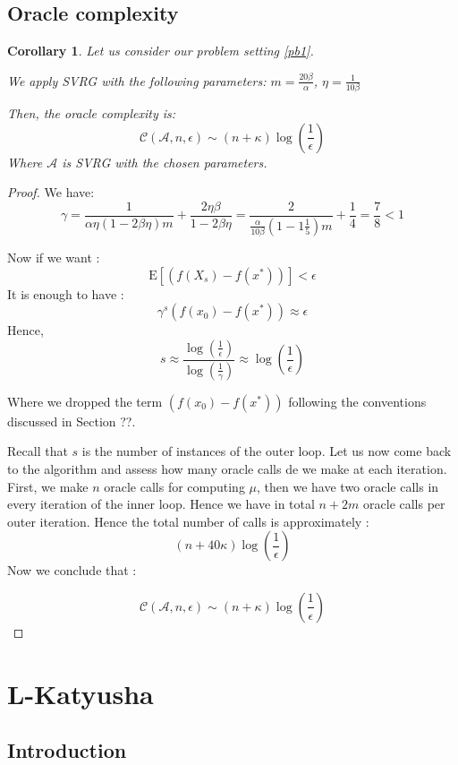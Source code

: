 \documentclass[12pt]{report}
\newtheorem{corollary}[lemma]{Corollary}
\newcounter{theo}[section]
\newcommand{\E}{\mathrm{E}}
\begin{document}
\section{Oracle complexity}

\begin{corollary}


Let us consider our problem setting \ref{pb1}.

We apply SVRG with the following parameters:
$m=\frac{20\beta}{\alpha}$,  $\eta=\frac{1}{10\beta}$

Then, the oracle complexity is:
$$ \mathcal{C}(\mathcal{A},n,\epsilon)\sim \left(n+\kappa \right)\log\left(\frac{1}{\epsilon}\right)$$
Where $\mathcal{A}$ is SVRG with the chosen parameters.
\end{corollary}

\begin{proof}
We have:
$$\gamma=\frac{1}{\alpha\eta(1-2\beta\eta)m}+\frac{2\eta\beta}{1-2\beta\eta}=\frac{2}{\frac{\alpha}{10\beta}(1-1\frac{1}{5})m}+\frac{1}{4}=\frac{7}{8}<1$$


Now if we want : $$\E[\left(f({X}_s)-f(x^*)\right)]<\epsilon $$
It is enough to have : 
$$\gamma^s \left(f({x}_{0})-f(x^*)\right)\approx \epsilon$$
Hence, $$s \approx \frac{\log(\frac{1}{\epsilon})}{\log(\frac{1}{\gamma})} \approx {\log\left(\frac{1}{\epsilon}\right)}$$

Where we dropped the term $\left(f({x}_{0})-f(x^*)\right)$  following the conventions discussed in Section ??.

Recall that $s$ is the number of instances of the outer loop. Let us now come back to the algorithm and assess how many oracle calls de we make at each iteration. First, we make $n$ oracle calls for computing $\mu$, then we have two oracle calls in every iteration of the inner loop. Hence we have in total $n+2m$ oracle calls per outer iteration.
Hence the total number of calls is approximately :
$$(n+40\kappa) {\log\left(\frac{1}{\epsilon}\right)}$$
Now we conclude that :

$$ \mathcal{C}(\mathcal{A},n,\epsilon)\sim \left(n+\kappa \right)\log\left(\frac{1}{\epsilon}\right)$$


\end{proof}

\chapter{L-Katyusha}

\section{Introduction}
\end{document}
